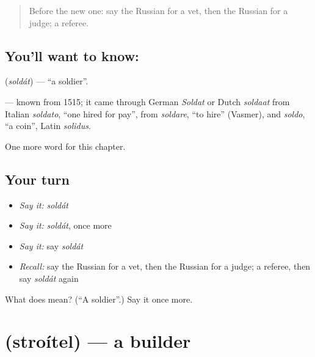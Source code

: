 \label{lesson:RU-C171-soldat}



\begin{quote}
Before the new one: say the Russian for a vet, then the Russian for a judge; a referee.
\end{quote}

\subsection*{You'll want to know: }
\textbf{} (\emph{soldát}) — \textquotedblleft{}a soldier\textquotedblright{}.

\begin{cousinweb}
\textbf{} — known from 1515; it came through German \emph{Soldat} or Dutch \emph{soldaat} from Italian \emph{soldato}, \textquotedblleft{}one hired for pay\textquotedblright{}, from \emph{soldare}, \textquotedblleft{}to hire\textquotedblright{} (Vasmer), and \emph{soldo}, \textquotedblleft{}a coin\textquotedblright{}, Latin \emph{solidus}.
\end{cousinweb}

\begin{grammarlens}[title={What you've built}]
One more word for this chapter.
\end{grammarlens}

\subsection*{Your turn}
\begin{itemize}
\raggedright
  \item \emph{Say it:} \emph{soldát}
  \item \emph{Say it:} \emph{soldát}, once more
  \item \emph{Say it:} say \emph{soldát}
  \item \emph{Recall:} say the Russian for a vet, then the Russian for a judge; a referee, then say \emph{soldát} again
\end{itemize}

\begin{tcolorbox}[breakable,colback=teal!4,colframe=teal!35!black,title={Before you move on}]
What does  mean? (\textquotedblleft{}A soldier\textquotedblright{}.) Say it once more.
\end{tcolorbox}
\section[\texorpdfstring{\ru{строитель} (stroítel)}{строитель (stroítel)}]{ (stroítel) — a builder}

